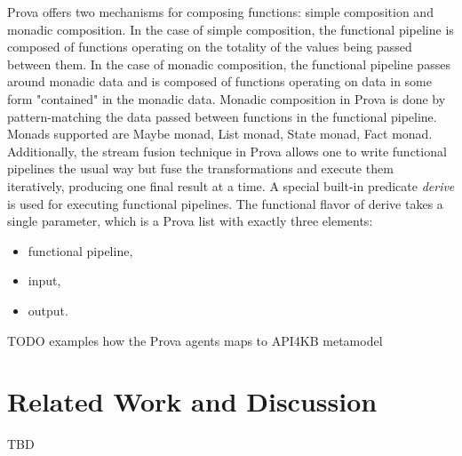 \documentclass[runningheads]{llncs}
\begin{document}
Prova offers two mechanisms for composing functions: simple composition and monadic composition. In the case of simple composition, the functional pipeline is composed of functions operating on the totality of the values being passed between them. In the case of monadic composition, the functional pipeline passes around monadic data and is composed of functions operating on data in some form "contained" in the monadic data. Monadic composition in Prova is done by pattern-matching the data passed between functions in the functional pipeline.
Monads supported are Maybe monad,  List monad, State monad, Fact monad. Additionally, the stream fusion technique in Prova allows one to write functional pipelines the usual way but fuse the transformations and execute them iteratively, producing one final result at a time. A special built-in predicate \textit{derive} is used for executing functional pipelines. The functional flavor of derive takes a single parameter, which is a Prova list with exactly three elements:
\begin{itemize}
  \item functional pipeline,
  \item input,
  \item output.
\end{itemize}
    
TODO examples how the Prova agents maps to API4KB metamodel


\section{Related Work and Discussion}
TBD


\end{document}
